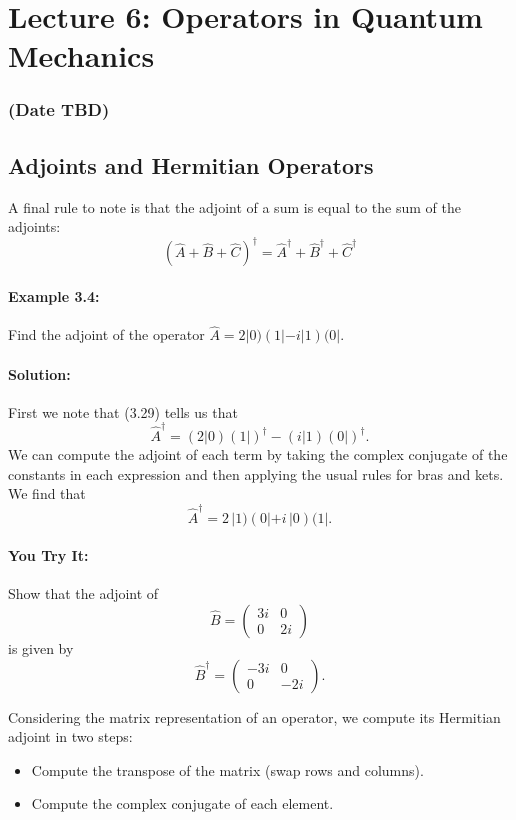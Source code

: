 \documentclass{article}
\begin{document}
\newpage
\section{Lecture 6: Operators in Quantum Mechanics}
\subsubsection*{(Date TBD)}

\subsection{Adjoints and Hermitian Operators}

A final rule to note is that the adjoint of a sum is equal to the sum of the adjoints:
\[
(\hat{A} + \hat{B} + \hat{C})^{\dagger} = \hat{A}^{\dagger} + \hat{B}^{\dagger} + \hat{C}^{\dagger}
\tag{3.29}
\]

\paragraph{Example 3.4:} Find the adjoint of the operator \(\hat{A} = 2|0)(1| - i|1)(0|\).

\paragraph{Solution:} 
First we note that (3.29) tells us that
\[
\hat{A}^{\dagger} = (2|0)(1|)^{\dagger} - (i|1)(0|)^{\dagger}.
\]
We can compute the adjoint of each term by taking the complex conjugate of the constants in each expression and then applying the usual rules for bras and kets. We find that
\[
\hat{A}^{\dagger} = 2 \,|1)(0| + i \,|0)(1|.
\]

\paragraph{You Try It:} 
Show that the adjoint of 
\[
\hat{B} = 
\begin{pmatrix}
3i & 0 \\
0 & 2i
\end{pmatrix}
\]
is given by 
\[
\hat{B}^{\dagger} =
\begin{pmatrix}
-3i & 0 \\
0 & -2i
\end{pmatrix}.
\]

Considering the matrix representation of an operator, we compute its Hermitian adjoint in two steps:
\begin{itemize}
\item Compute the transpose of the matrix (swap rows and columns).
\item Compute the complex conjugate of each element.
\end{itemize}
\end{document}
